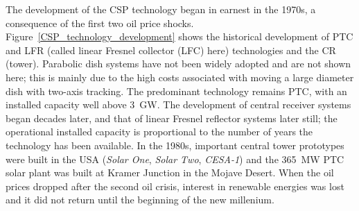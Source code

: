 The development of the CSP technology began in earnest in the 1970s, a consequence of the first two oil price shocks. Figure~\ref{CSP_technology_development} shows the historical development of PTC and LFR (called linear Fresnel collector (LFC) here) technologies and the CR (tower). Parabolic dish systems have not been widely adopted and are not shown here; this is mainly due to the high costs associated with moving a large diameter dish with two-axis tracking. The predominant technology remains PTC, with an installed capacity well above \SI{3}{GW}. The development of central receiver systems began decades later, and that of linear Fresnel reflector systems later still; the operational installed capacity is proportional to the number of years the technology has been available. In the 1980s, important central tower prototypes were built in the USA (\emph{Solar One}, \emph{Solar Two}, \emph{CESA-1}) and the \SI{365}{\mega\watt} PTC solar plant was built at Kramer Junction in the Mojave Desert. When the oil prices dropped after the second oil crisis, interest in renewable energies was lost and it did not return until the beginning of the new millenium. 


